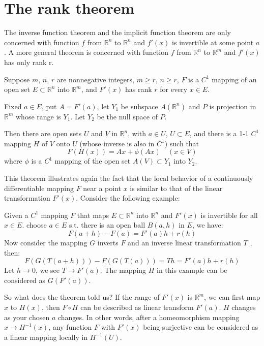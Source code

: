 \section{The rank theorem}
The inverse function theorem and the implicit function theorem are only concerned with function $f$ from $\mathbb{R}^n$ to $\mathbb{R}^n$ and $f'(x)$ is invertible at some point $a$. A more general theorem is concerned with function $f$ from $\mathbb{R}^n$ to $\mathbb{R}^m$ and $f'(x)$ has only rank r.\par
\begin{theorem}
    Suppose $m$, $n$, $r$ are nonnegative integers, $m\geq r$, $n\geq r$, $F$ is a $C^1$ mapping of an open set $E\subset \mathbb{R}^n$ into $\mathbb{R}^m$, and $F'(x)$ has rank $r$ for every $x\in E$.\par
    Fixed $a\in E$, put $A=F'(a)$, let $Y_1$ be subspace $A(\mathbb{R}^n)$ and $P$ is projection in $\mathbb{R}^m$ whose range is $Y_1$. Let $Y_2$ be the null space of $P$.\par
    Then there are open sets $U$ and $V$ in $\mathbb{R}^n$, with $a\in U$, $U\subset E$, and there is a 1-1 $C^1$ mapping $H$ of $V$ onto $U$ (whose inverse is also in $C^1$) such that
    \begin{equation*}
        F(H(x))=Ax+\phi(Ax)\quad (x\in V)
    \end{equation*}
    where $\phi$ is a $C^1$ mapping of the open set $A(V)\subset Y_1$ into $Y_2$.
\end{theorem}
This theorem illustrates again the fact that the local behavior of a continuously differentiable mapping $F$ near a point $x$ is similar to that of the linear transformation $F'(x)$. Consider the following example:\par
Given a $C^1$ mapping $F$ that maps $E\subset \mathbb{R}^n$ into $\mathbb{R}^n$ and $F'(x)$ is invertible for all $x\in E$. choose $a\in E$ s.t. there is an open ball $B(a,h)$ in $E$, we have:
\begin{equation*}
    F(a+h)-F(a)=F'(a)h+r(h)
\end{equation*}
Now consider the mapping $G$ inverts $F$ and an inverse linear transformation $T$ , then:
\begin{equation*}
    F(G(T(a+h)))-F(G(T(a)))=Th=F'(a)h+r(h)
\end{equation*}
Let $h\to 0$, we see $T\to F'(a)$. The mapping $H$ in this example can be considered as $G(F'(a))$.\par
So what does the theorem told us? If the range of $F'(x)$ is $\mathbb{R}^m$, we can first map $x$ to $H(x)$, then $F\circ H$ can be described as linear transform $F'(a)$. $H$ changes as your chosen $a$ changes. In other words, after a homeomorphism mapping $x\to H^{-1}(x)$, any function $F$ with $F'(x)$ being surjective can be considered as a linear mapping locally in $H^{-1}(U)$.\par

